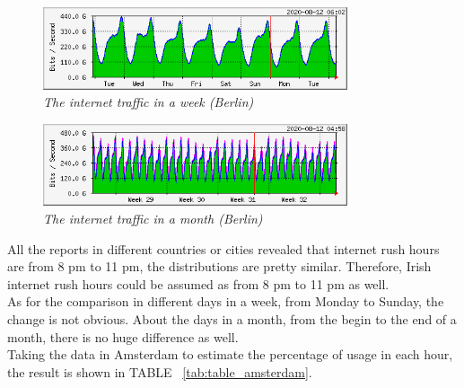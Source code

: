 \begin{figure}[hbt!]
    \centering
    \includegraphics[width=0.8\textwidth]{figure/berlin-week.png}
    \caption{\em The internet traffic in a week (Berlin) \cite{Amsterdam_internet_traffic} \label{fig:internet_traffic_week_Berlin}}
\end{figure}

\begin{figure}[hbt!]
    \centering
    \includegraphics[width=0.8\textwidth]{figure/berlin-month.png}
    \caption{\em The internet traffic in a month (Berlin) \cite{Amsterdam_internet_traffic} \label{fig:internet_traffic_month_Berlin}}
\end{figure}

All the reports in different countries or cities revealed that internet rush hours are from 8 pm to 11 pm, the distributions are pretty similar. Therefore, Irish internet rush hours could be assumed as from 8 pm to 11 pm as well. 
\\

As for the comparison in different days in a week, from Monday to Sunday, the change is not obvious. About the days in a month, from the begin to the end of a month, there is no huge difference as well.
\\

Taking the data in Amsterdam to estimate the percentage of usage in each hour, the result is shown in TABLE ~\ref{tab:table_amsterdam}.
\\

